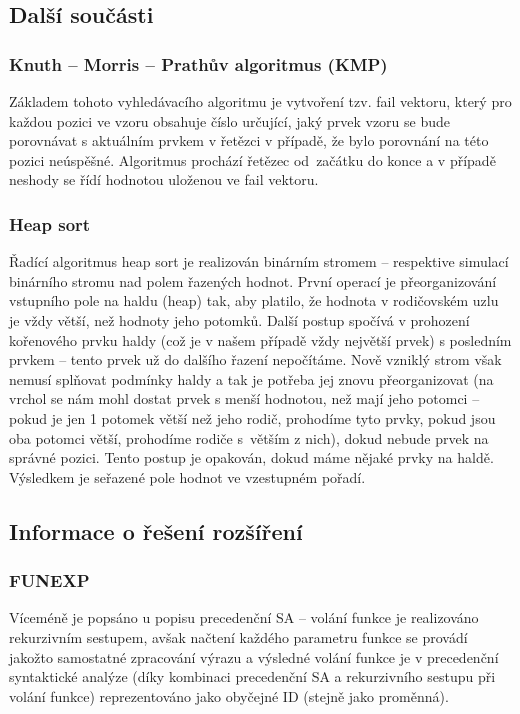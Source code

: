 \documentclass[12pt,a4paper,titlepage,final]{article}
\begin{document}
\subsection{Další součásti}
\subsubsection{Knuth – Morris – Prathův algoritmus (KMP)}
Základem tohoto vyhledávacího algoritmu je vytvoření tzv. fail vektoru\cite{kmp_alg}, 
který pro každou pozici ve vzoru obsahuje číslo určující, jaký prvek vzoru 
se bude porovnávat s aktuálním prvkem v řetězci v případě, že bylo porovnání 
na této pozici neúspěšné. Algoritmus prochází řetězec od~začátku do konce a 
v případě neshody se řídí hodnotou uloženou ve fail vektoru.

\subsubsection{Heap sort}
Řadící algoritmus heap sort je realizován binárním stromem – respektive 
simulací binárního stromu nad polem řazených hodnot. První operací je 
přeorganizování vstupního pole na haldu (heap) tak, aby platilo, že hodnota 
v rodičovském uzlu je vždy větší, než hodnoty jeho potomků. Další postup 
spočívá v prohození kořenového prvku haldy (což je v našem případě vždy 
největší prvek) s posledním prvkem – tento prvek už do dalšího řazení 
nepočítáme. Nově vzniklý strom však nemusí splňovat podmínky haldy a tak 
je potřeba jej znovu přeorganizovat (na vrchol se nám mohl dostat prvek 
s menší hodnotou, než mají jeho potomci – pokud je jen 1 potomek větší než 
jeho rodič, prohodíme tyto prvky, pokud jsou oba potomci větší, prohodíme 
rodiče s~větším z nich), dokud nebude prvek na správné pozici. Tento postup 
je opakován, dokud máme nějaké prvky na haldě. Výsledkem je seřazené pole 
hodnot ve vzestupném pořadí.

\subsection{Informace o řešení rozšíření}
\subsubsection{FUNEXP}
Víceméně je popsáno u popisu precedenční SA – volání funkce je realizováno 
rekurzivním sestupem, avšak načtení každého parametru funkce se provádí 
jakožto samostatné zpracování výrazu a výsledné volání funkce je v precedenční 
syntaktické analýze (díky kombinaci precedenční SA a rekurzivního sestupu 
při volání funkce) reprezentováno jako obyčejné ID (stejně jako proměnná).
\end{document}
